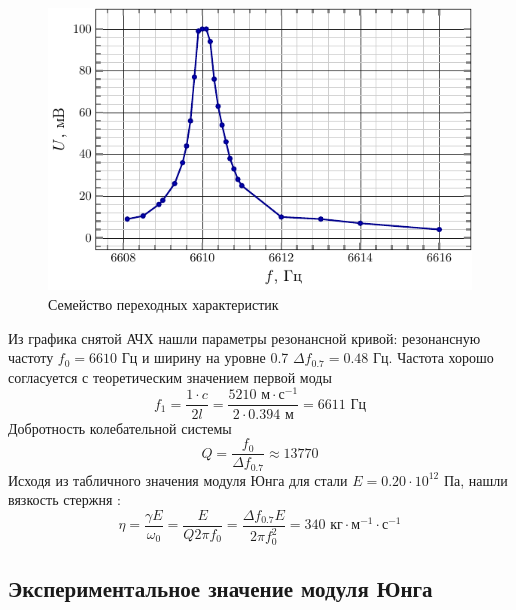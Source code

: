 \begin{figure}[H]
	\centering
	\includegraphics[scale=1.5]{fig/steel_afc.pdf}
	\vspace{-1em}
	\caption{Семейство переходных характеристик}
	\label{fig:2}
\end{figure}
Из графика снятой АЧХ нашли параметры резонансной кривой: резонансную частоту
$f_0=6610\text{ Гц}$ и ширину на уровне 0.7 $\Delta f_{0.7} = 0.48\text{ Гц}$. 
Частота хорошо согласуется с теоретическим значением первой моды
\begin{equation}
	f_1 = \frac{1\cdot c}{2l} = \frac{5210 \text{ м}\cdot\text{с}^{-1}}{2\cdot 0.394\text{ м}}=6611 \text{ Гц}
\end{equation}
Добротность колебательной системы
\begin{equation}
	Q = \frac{f_0}{\Delta f_{0.7}} \approx 13770
\end{equation}
Исходя из табличного значения модуля Юнга для стали $E=0.20\cdot10^{12}$ Па, нашли вязкость стержня  \cite[стр. 10]{met}:
\begin{equation}
	\eta = \frac{\gamma E}{\omega_0} = \frac{ E}{Q 2\pi f_0} = \frac{\Delta f_{0.7} E}{2\pi f_0^2} = 340 \text{ кг}\cdot\text{м}^{-1}\cdot\text{с}^{-1}
\end{equation}

\newpage
\subsection{Экспериментальное значение модуля Юнга}

